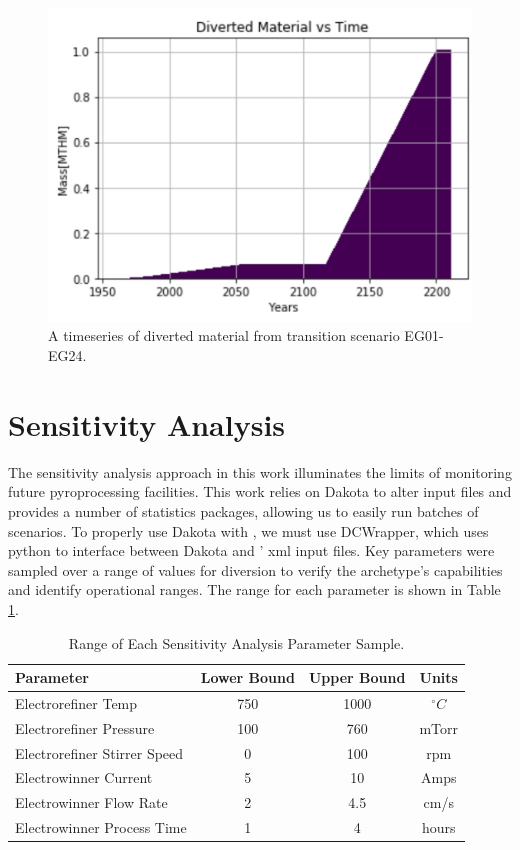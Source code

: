 \begin{figure}
	\centering
	\includegraphics[width=0.9\linewidth]{images/divertmat}
	\caption{A timeseries of diverted material from transition scenario EG01-EG24.}
	\label{fig:divertmat}
\end{figure}

\section{Sensitivity Analysis}

The sensitivity analysis approach in this work illuminates the limits of monitoring future pyroprocessing facilities. This work relies on Dakota to alter \Cyclus input files and provides a number of statistics packages, allowing us to easily
run batches of scenarios. To properly use Dakota with \Cyclus, we must use DCWrapper, which uses python to interface between Dakota and \Cyclus' xml input files. 
Key parameters were sampled over a range of values for diversion to verify the archetype's capabilities and identify operational ranges. The range for each parameter is shown in Table \ref{tab:range}. 

\begin{table}[h]
	\centering
	\begin{tabularx}{0.85\linewidth}{lccc}
		\hline
		\textbf{Parameter} & \textbf{Lower Bound} & \textbf{Upper Bound} & \textbf{Units} \\
		\hline \hline
		Electrorefiner Temp & 750 & 1000 & $^\circ C$ \\ \hline
		Electrorefiner Pressure & 100 & 760 & mTorr \\ \hline
		Electrorefiner Stirrer Speed & 0 & 100 & rpm \\ \hline
		Electrowinner Current & 5 & 10 & Amps \\ \hline
		Electrowinner Flow Rate & 2 & 4.5 & cm/s \\ \hline
		Electrowinner Process Time & 1 & 4 & hours \\ \hline
	\end{tabularx}
	\caption {Range of Each Sensitivity Analysis Parameter Sample.}
	\label {tab:range}
\end{table}

